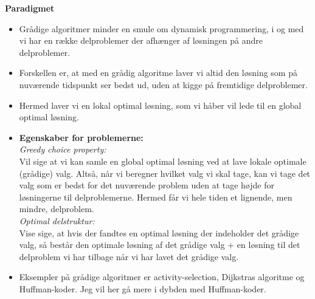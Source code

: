\textbf{Paradigmet}

\begin{itemize}
	\item Grådige algoritmer minder en smule om dynamisk programmering, i og med vi har en række delproblemer der afhænger af løsningen på andre delproblemer.
	\item Forskellen er, at med en grådig algoritme laver vi altid den løsning som på nuværende tidspunkt ser bedst ud, uden at kigge på fremtidige delproblemer.
	\item Hermed laver vi en lokal optimal løsning, som vi håber vil lede til en global optimal løsning. 

\item \textbf{Egenskaber for problemerne:}\\
\textit{Greedy choice property:}\\
Vil sige at vi kan samle en global optimal løsning ved at lave lokale optimale (grådige) valg. Altså, når vi beregner hvilket valg vi skal tage, kan vi tage det valg som er bedst for det nuværende problem uden at tage højde for løsningerne til delproblemerne. Hermed får vi hele tiden et lignende, men mindre, delproblem.\\



\textit{Optimal delstruktur:}\\
Vise sige, at hvis der fandtes en optimal løsning der indeholder det grådige valg, så består den optimale løsning af det grådige valg + en løsning til det delproblem vi har tilbage når vi har lavet det grådige valg.\\



\item Eksempler på grådige algoritmer er activity-selection, Dijkstras algoritme og Huffman-koder. Jeg vil her gå mere i dybden med Huffman-koder.
\end{itemize}


